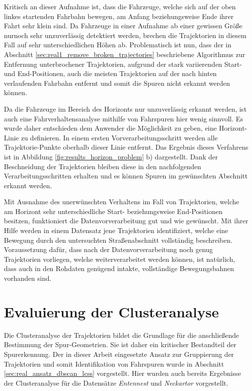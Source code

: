 Kritisch an dieser Aufnahme ist, dass die Fahrzeuge, welche sich auf der oben linkes startenden Fahrbahn bewegen,
am Anfang beziehungsweise Ende ihrer Fahrt sehr klein sind. Da Fahrzeuge in einer Aufnahme ab einer gewissen Größe
nurnoch sehr unzuverlässig detektiert werden, brechen die Trajektorien in diesem Fall auf sehr
unterschiedlichen Höhen ab.
Problematisch ist nun, dass der in Abschnitt \ref{sec:real1_remove_broken_trajectories} beschriebene Algorithmus
zur Entfernung unterbrochener Trajektorien, aufgrund der stark variierenden Start- und End-Positionen,
auch die meisten Trajektorien auf der nach hinten verlaufenden Fahrbahn entfernt und somit die Spuren nicht erkannt werden können.

Da die Fahrzeuge im Bereich des Horizonts nur unzuverlässig erkannt werden, ist auch eine Fahrverhaltensanalyse
mithilfe von Fahrspuren hier wenig sinnvoll. Es wurde daher entschieden dem Anwender die Möglichkeit zu geben, eine
Horizont-Linie zu definieren. In einem ersten Vorverarbeitungsschritt werden alle Trajektorie-Punkte oberhalb dieser
Linie entfernt. Das Ergebnis dieses Verfahrens ist in Abbildung \ref{fig:results_horizon_problem} b)
dargestellt. Dank der Beschneidung der Trajektorien bleiben diese in den nachfolgenden Verarbeitungsschritten
erhalten und es können Spuren im gewünschten Abschnitt erkannt werden.

Mit Ausnahme des unerwünschten Verhaltens im Fall von Trajektorien, welche am Horizont sehr unterschiedliche Start-
beziehungsweise End-Positionen besitzen, funktioniert die Datenvorverarbeitung gut und wie gewünscht.
Mit ihrer Hilfe werden in einem Datensatz jene Trajektorien identifiziert, welche eine Bewegung durch den
untersuchten Straßenabschnitt vollständig beschreiben. Voraussetzung dafür, dass nach der Datenvorverarbeitung
noch genug Trajektorien vorliegen, welche weiterverarbeitet werden können, ist natürlich, dass auch in
den Rohdaten genügend intakte, vollständige Bewegungsbahnen vorhanden sind.

\section{Evaluierung der Clusteranalyse}
\label{sec:results_eval_clustering}

Die Clusteranalyse der Trajektorien bildet die Grundlage für die anschließende Bestimmung der Spur-Geometrien.
Sie ist daher ein kritischer Bestandteil der Spurerkennung. Der in dieser Arbeit eingesetzte Ansatz zur
Gruppierung der Trajektorien und somit Identifikation von Fahrspuren wurde in Abschnitt \ref{sec:real_ansatz_dbscan_lcss}
vorgestellt. Hier wurden auch bereits Ergebnisse der Clusteranalyse für die Datensätze \textit{Entennest} und
\textit{Neckartor} vorgestellt.

